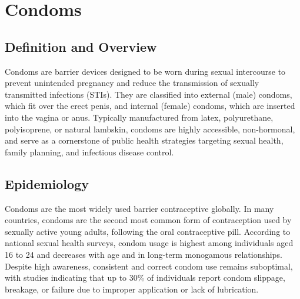 \chapter{Condoms}

\section*{Definition and Overview}
Condoms are barrier devices designed to be worn during sexual intercourse to prevent unintended pregnancy and reduce the transmission of sexually transmitted infections (STIs). They are classified into external (male) condoms, which fit over the erect penis, and internal (female) condoms, which are inserted into the vagina or anus. Typically manufactured from latex, polyurethane, polyisoprene, or natural lambskin, condoms are highly accessible, non-hormonal, and serve as a cornerstone of public health strategies targeting sexual health, family planning, and infectious disease control.

\section*{Epidemiology}
Condoms are the most widely used barrier contraceptive globally. In many countries, condoms are the second most common form of contraception used by sexually active young adults, following the oral contraceptive pill. According to national sexual health surveys, condom usage is highest among individuals aged 16 to 24 and decreases with age and in long-term monogamous relationships. Despite high awareness, consistent and correct condom use remains suboptimal, with studies indicating that up to 30\% of individuals report condom slippage, breakage, or failure due to improper application or lack of lubrication.

